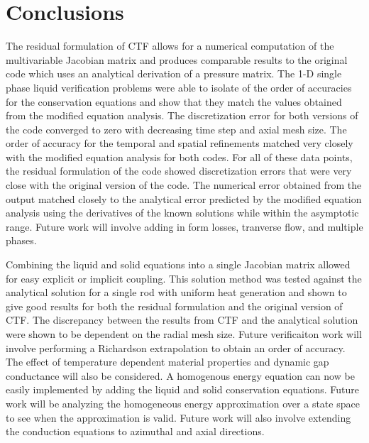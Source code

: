 \vspace*{-80mm}
\chapter{Conclusions} \label{chapter7:uniform_heating}
 

The residual formulation of CTF allows for a numerical computation of the
multivariable Jacobian matrix and produces comparable results to the original
code which uses an analytical derivation of a pressure matrix. The 1-D
single phase liquid verification problems were able to
isolate of the order of accuracies for the conservation equations and show that
they match the values obtained from the modified equation analysis. The
discretization error for both versions of the code converged to zero with
decreasing time step and axial mesh size. The order of accuracy for the temporal
and spatial refinements matched very closely with the modified equation analysis
for both codes. For all of these data points, the residual formulation of the
code showed discretization errors that were very close with the original version
of the code. The numerical error obtained from the output matched closely to
the analytical error predicted by the modified equation analysis using the
derivatives of the known solutions while within the asymptotic range. Future
work will involve adding in form losses, tranverse flow, and multiple phases.

Combining the liquid and solid equations into a single Jacobian matrix allowed
for easy explicit or implicit coupling. This solution method was tested against
the analytical solution for a single rod with uniform heat generation and shown
to give good results for both the residual formulation and the original version
of CTF. The discrepancy between the results from CTF and the analytical solution
were shown to be dependent on the radial mesh size. Future verificaiton work
will involve performing a Richardson extrapolation to obtain an order of
accuracy. The effect of temperature dependent material properties and dynamic
gap conductance will also be considered. A homogenous energy equation can now be
easily implemented by adding the liquid and solid conservation equations. Future
work will be analyzing the homogeneous energy approximation over a state space
to see when the approximation is valid. Future work will also involve extending
the conduction equations to azimuthal and axial directions.


